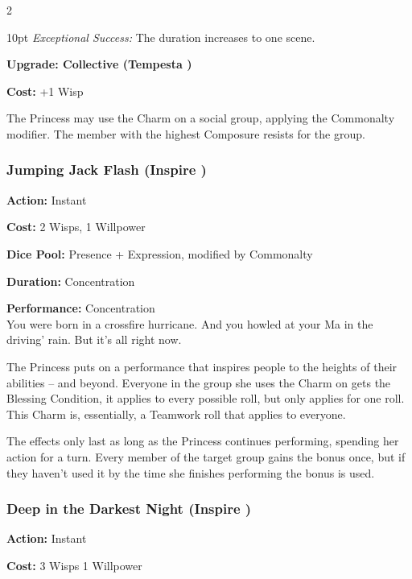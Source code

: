 \begin{multicols}{2}
\begin{myindentpar}{10pt}
    \emph{Exceptional Success:} The duration increases to one scene. 

\textbf{Upgrade: Collective (Tempesta \textbullet\textbullet\textbullet\textbullet)}

\noindent \textbf{Cost:} +1 Wisp

The Princess may use the Charm on a social group, applying the Commonalty modifier. The member with the highest Composure resists for the group.\end{myindentpar}

\subsubsection*{Jumping Jack Flash (Inspire \textbullet\textbullet\textbullet\textbullet\textbullet)}

\noindent \textbf{Action:} Instant 

\noindent \textbf{Cost:} 2 Wisps, 1 Willpower

\noindent \textbf{Dice Pool:} Presence + Expression, modified by Commonalty

\noindent \textbf{Duration:} Concentration 

\noindent \textbf{Performance:} Concentration \\ 

\noindent You were born in a crossfire hurricane. And you howled at your Ma in the driving' rain. But it's all right now.

The Princess puts on a performance that inspires people to the heights of their abilities -- and beyond. Everyone in the group she uses the Charm on gets the Blessing Condition, it applies to every possible roll, but only applies for one roll. This Charm is, essentially, a Teamwork roll that applies to everyone. 

The effects only last as long as the Princess continues performing, spending her action for a turn. Every member of the target group gains the bonus once, but if they haven't used it by the time she finishes performing the bonus is used.

\subsubsection*{Deep in the Darkest Night (Inspire \textbullet\textbullet\textbullet\textbullet\textbullet)}

\noindent \textbf{Action:} Instant

\noindent \textbf{Cost:} 3 Wisps 1 Willpower


\end{multicols}
